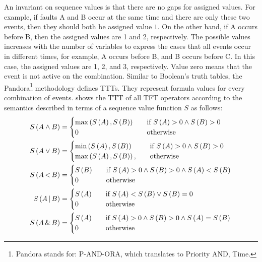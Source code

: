 \documentclass[12pt,openright,twoside,a4paper,oldfontcommands,english,brazil,final]{abntex2}
\theoremstyle{theo}
\def\pandora{Pandora\footnote{Pandora stands for: P-AND-ORA, which translates to Priority AND, Time.}%
  \gdef\pandora{Pandora\xspace}%
  \xspace}
\newcommand{\parsin}[1]{\ensuremath\left( #1 \right)}
\def\pand{\ensuremath\operatorname{<}}
\def\por{\ensuremath\operatorname{|}}
\def\sand{\ensuremath\operatorname{\&}}
\begin{document}
An invariant on sequence values is that there are no gaps for assigned values.
For example, if faults A and B occur at the same time and there are only these two events, then they should both be assigned value $1$.
On the other hand, if A occurs before B, then the assigned values are 1 and 2, respectively.
The possible values increases with the number of variables to express the cases that all events occur in different times, for example, A occurs before B, and B occurs before C. 
In this case, the assigned values are 1, 2, and 3, respectively.
Value zero means that the event is not active on the combination.
Similar to Boolean's truth tables, the \pandora methodology defines \acp{TTT}.
They represent formula values for every combination of events.
 shows the \ac{TTT} of all \ac{TFT} operators according to the semantics described in terms of a sequence value function $S$ as follows:
%
\begin{subequations}
  \begin{align}
    S\parsin{A \land B} &=
    \begin{cases}
      \max \parsin{S\parsin{A}, S\parsin{B}} &\quad \text{if }S \parsin{A} > 0 \land S \parsin{B} > 0\\
      0 &\quad\text{otherwise}\\
    \end{cases}\\
%
    S\parsin{A \lor B} &=
    \begin{cases}
      \min \parsin{S\parsin{A}, S\parsin{B}} &\quad \text{if }S \parsin{A} > 0 \land S \parsin{B} > 0\\
      \max \parsin{S\parsin{A}, S\parsin{B}}, &\quad\text{otherwise}\\
    \end{cases}\\
%
    S\parsin{A \pand B} &=
    \begin{cases}
      S\parsin{B} &\quad \text{if }S \parsin{A} > 0 \land S \parsin{B} > 0 \land S \parsin{A} < S \parsin{B}\\
      0 &\quad\text{otherwise}\\
    \end{cases}\\
%
    S\parsin{A \por B} &=
    \begin{cases}
      S\parsin{A} &\quad \text{if } S \parsin{A} < S \parsin{B} \lor S \parsin{B} = 0\\
      0 &\quad\text{otherwise}\\
    \end{cases}\\
%
    S\parsin{A \sand B} &=
    \begin{cases}
      S\parsin{A} &\quad \text{if }S \parsin{A} > 0 \land S \parsin{B} > 0 \land S \parsin{A} = S \parsin{B}\\
      0 &\quad\text{otherwise}\\
    \end{cases}
  \end{align}
\end{subequations}
\end{document}
